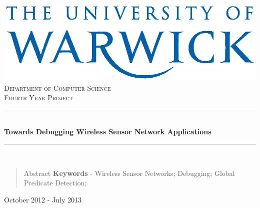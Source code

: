 \documentclass[a4paper,notitlepage]{article}
\newcommand{\HRule}{\rule{\linewidth}{0.5mm}}
\begin{document}
\begin{titlepage}
\begin{center}

\includegraphics[scale=1.15]{the_warwick_uni_blue.eps}\\[0.75cm]

\textsc{\LARGE Department of Computer Science}\\[1.5cm] 

\textsc{\Large Fourth Year Project}\\[0.5cm]


\HRule \\[0.4cm]
{\Huge \bfseries Towards Debugging Wireless Sensor Network Applications}\\[0.4cm]

\HRule \\[2cm]

\hfill
{}

\vfill

\begin{abstract}
Abstract
\newline
\newline
\noindent \textbf{Keywords} - Wireless Sensor Networks; Debugging; Global Predicate Detection;
\end{abstract}

\vfill
\vfill
\vfill
\vfill

{\large October 2012 - July 2013}

\end{center}
\end{titlepage}
\end{document}
